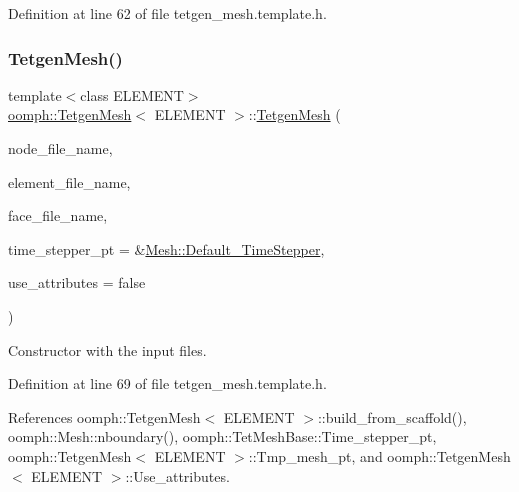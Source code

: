 Definition at line 62 of file tetgen\+\_\+mesh.\+template.\+h.

\mbox{\label{classoomph_1_1TetgenMesh_a10976b817c361f04da4ce996bd019c02}} 
\subsubsection{\texorpdfstring{Tetgen\+Mesh()}{TetgenMesh()}\hspace{0.1cm}{\footnotesize\ttfamily [2/6]}}
{\footnotesize\ttfamily template$<$class E\+L\+E\+M\+E\+NT$>$ \\
\hyperlink{classoomph_1_1TetgenMesh}{oomph\+::\+Tetgen\+Mesh}$<$ E\+L\+E\+M\+E\+NT $>$\+::\hyperlink{classoomph_1_1TetgenMesh}{Tetgen\+Mesh} (\begin{DoxyParamCaption}\item[{const std\+::string \&}]{node\+\_\+file\+\_\+name,  }\item[{const std\+::string \&}]{element\+\_\+file\+\_\+name,  }\item[{const std\+::string \&}]{face\+\_\+file\+\_\+name,  }\item[{\hyperlink{classoomph_1_1TimeStepper}{Time\+Stepper} $\ast$}]{time\+\_\+stepper\+\_\+pt = {\ttfamily \&\hyperlink{classoomph_1_1Mesh_a12243d0fee2b1fcee729ee5a4777ea10}{Mesh\+::\+Default\+\_\+\+Time\+Stepper}},  }\item[{const bool \&}]{use\+\_\+attributes = {\ttfamily false} }\end{DoxyParamCaption})\hspace{0.3cm}{\ttfamily [inline]}}



Constructor with the input files. 



Definition at line 69 of file tetgen\+\_\+mesh.\+template.\+h.



References oomph\+::\+Tetgen\+Mesh$<$ E\+L\+E\+M\+E\+N\+T $>$\+::build\+\_\+from\+\_\+scaffold(), oomph\+::\+Mesh\+::nboundary(), oomph\+::\+Tet\+Mesh\+Base\+::\+Time\+\_\+stepper\+\_\+pt, oomph\+::\+Tetgen\+Mesh$<$ E\+L\+E\+M\+E\+N\+T $>$\+::\+Tmp\+\_\+mesh\+\_\+pt, and oomph\+::\+Tetgen\+Mesh$<$ E\+L\+E\+M\+E\+N\+T $>$\+::\+Use\+\_\+attributes.

\mbox{\label{classoomph_1_1TetgenMesh_ace863f736d0dfa0a059b28959fced51d}} 
